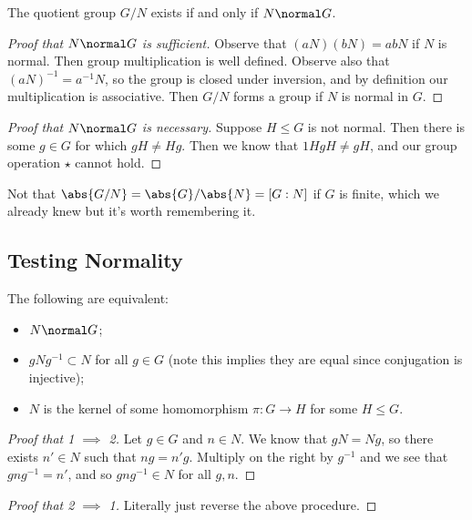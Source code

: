 \begin{theorem}
The quotient group $G / N$ exists if and only if $N \normal G$.
\end{theorem}

\begin{proof}[Proof that $N \normal G$ is sufficient]
Observe that $(aN)(bN) = abN$ if $N$ is normal. Then group multiplication is well defined. Observe also that $(aN)^{-1} = a^{-1}N$, so the group is closed under inversion, and by definition our multiplication is associative. Then $G/N$ forms a group if $N$ is normal in $G$.
\end{proof}

\begin{proof}[Proof that $N \normal G$ is necessary]
Suppose $H \leq G$ is not normal. Then there is some $g \in G$ for which $gH \not= Hg$. Then we know that $1HgH \not= gH$, and our group operation $\star$ cannot hold.
\end{proof}

Not that $\abs{G/N} = \abs{G} / \abs{N} = [G : N]$ if $G$ is finite, which we already knew but it's worth remembering it.

\subsection{Testing Normality}

\begin{proposition}
The following are equivalent:
\begin{itemize}
\item $N \normal G$;
\item $gNg^{-1} \subset N$ for all $g \in G$ (note this implies they are equal since conjugation is injective);
\item $N$ is the kernel of some homomorphism $\pi : G \to H$ for some $H \leq G$.
\end{itemize}
\end{proposition}

\begin{proof}[Proof that 1 $\implies$ 2]
Let $g \in G$ and $n \in N$. We know that $gN = Ng$, so there exists $n' \in N$ such that $ng = n'g$. Multiply on the right by $g^{-1}$ and we see that $gng^{-1} = n'$, and so $gng^{-1} \in N$ for all $g,n$.
\end{proof}

\begin{proof}[Proof that 2 $\implies$ 1]
Literally just reverse the above procedure.
\end{proof}

